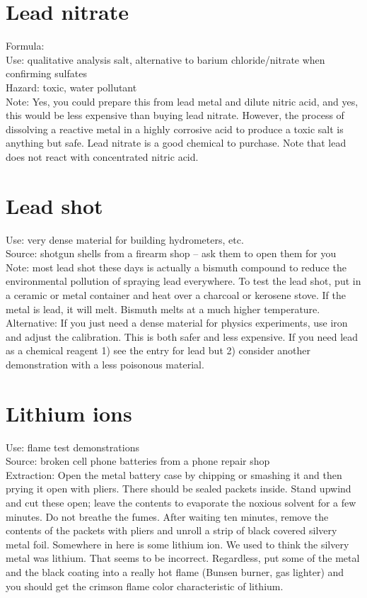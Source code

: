 \section{Lead nitrate}
Formula: \\
Use: qualitative analysis salt, 
alternative to barium chloride/nitrate when confirming sulfates\\
Hazard: toxic, 
water pollutant\\
Note: Yes, 
you could prepare this from lead metal and dilute nitric acid, 
and yes, 
this would be less expensive than buying lead nitrate. 
However, 
the process of dissolving a reactive metal in a highly corrosive acid 
to produce a toxic salt is anything but safe. 
Lead nitrate is a good chemical to purchase. 
Note that lead does not react with concentrated nitric acid.

\section{Lead shot}
Use: very dense material for building hydrometers, 
etc.\\
Source: shotgun shells from a firearm shop -- 
ask them to open them for you\\
Note: most lead shot these days is actually a bismuth compound 
to reduce the environmental pollution of spraying lead everywhere. 
To test the lead shot, 
put in a ceramic or metal container 
and heat over a charcoal or kerosene stove. 
If the metal is lead, 
it will melt. 
Bismuth melts at a much higher temperature.\\
Alternative: If you just need a dense material for physics experiments, 
use iron and adjust the calibration. 
This is both safer and less expensive. 
If you need lead as a chemical reagent 
1) see the entry for lead but 
2) consider another demonstration with a less poisonous material.

\section{Lithium ions}
Use: flame test demonstrations\\
Source: broken cell phone batteries from a phone repair shop\\
Extraction: Open the metal battery case by chipping 
or smashing it and then prying it open with pliers. 
There should be sealed packets inside. 
Stand upwind and cut these open; 
leave the contents to evaporate the noxious solvent for a few minutes. 
Do not breathe the fumes. 
After waiting ten minutes, 
remove the contents of the packets with pliers 
and unroll a strip of black covered silvery metal foil. 
Somewhere in here is some lithium ion. 
We used to think the silvery metal was lithium. 
That seems to be incorrect. 
Regardless, put some of the metal and the black coating
into a really hot flame (Bunsen burner, gas lighter)
and you should get the crimson flame color
characteristic of lithium.

